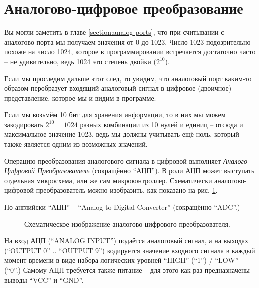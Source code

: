 \documentclass[../sparc.tex]{subfiles}
\begin{document}
\section{Аналогово-цифровое преобразование}

Вы могли заметить в главе \ref{section:analog-ports}, что при считывании с
аналогово порта мы получаем значения от 0 до 1023.  Число 1023 подозрительно
похоже на число 1024, которое в программировании встречается достаточно часто --
не удивительно, ведь 1024 это степень двойки ($2^{10}$).

Если мы проследим дальше этот след, то увидим, что аналоговый порт каким-то
образом перобразует входящий аналоговый сигнал в цифровое (двоичное)
представление, которое мы и видим в программе.

Если мы возьмём 10 бит для хранения информации, то в них мы можем закодировать
$2^{10} = 1024$ разных комбинации из 10 нулей и единиц -- отсюда и максимальное
значение 1023, ведь мы должны учитывать ещё ноль, который также является одним
из возможных значений.

Операцию преобразования аналогового сигнала в цифровой выполняет
\emph{Аналого-Цифровой Преобразователь} (сокращённо ``АЦП'').  В роли АЦП может
выступать отдельная микросхема, или же сам микроконтроллер.  Схематически
аналогово-цифровой преобразователь можно изобразить, как показано на
рис. \ref{fig:adc-schematics}.

По-английски ``АЦП'' -- ``Analog-to-Digital Converter'' (сокращённо ``ADC''.)

\begin{figure}[ht]
  \centering
  \caption{Схематическое изображение аналогово-цифрового преобразователя.}
  \label{fig:adc-schematics}
\end{figure}

На вход АЦП (``ANALOG INPUT'') подаётся аналоговый сигнал, а на выходах
(``OUTPUT 0'' .. ``OUTPUT 9'') кодируется значение входного сигнала в каждый
момент времени в виде набора логических уровней ``HIGH'' (``1'') / ``LOW''
(``0''.)  Самому АЦП требуется также питание -- для этого как раз предназначены
выводы ``VCC'' и ``GND''.
\end{document}
